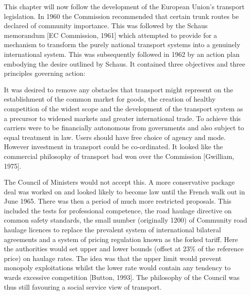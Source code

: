 This chapter will now follow the development of the European Union's transport legislation. In 1960 the Commission recommended that certain trunk routes be declared of community importance. This was followed by the Schaus memorandum [EC Commission, 1961] which attempted to provide for a mechanism to transform the purely national transport systems into a genuinely international system. This was subsequently followed in 1962 by an action plan embodying the desire outlined by Schaus. It contained three objectives and three principles governing action:

\begin{displayquote}
It was desired to remove any obstacles that transport might represent on the establishment of the common market for goods, the creation of healthy competition of the widest scope and the development of the transport system as a precursor to widened markets and greater international trade. To achieve this carriers were to be financially autonomous from governments and also subject to equal treatment in law. Users should have free choice of agency and mode. However investment in transport could be co-ordinated. It looked like the commercial philosophy of transport bad won over the Commission [Gwilliam, 1975].
\end{displayquote}

The Council of Ministers would not accept this. A more conservative package deal was worked on and looked likely to become law until the French walk out in June 1965. There was then a period of much more restricted proposals. This included the tests for professional competence, the road haulage directive on common safety standards, the small number (originally 1200) of Community road haulage licences to replace the prevalent system of international bilateral agreements and a system of pricing regulation known as the forked tariff. Here the authorities would set upper and lower bounds (offset at 23\% of the reference price) on haulage rates. The idea was that the upper limit would prevent monopoly exploitations whilst the lower rate would contain any tendency to wards excessive competition [Button, 1993]. The philosophy of the Council was thus still favouring a social service view of transport.

